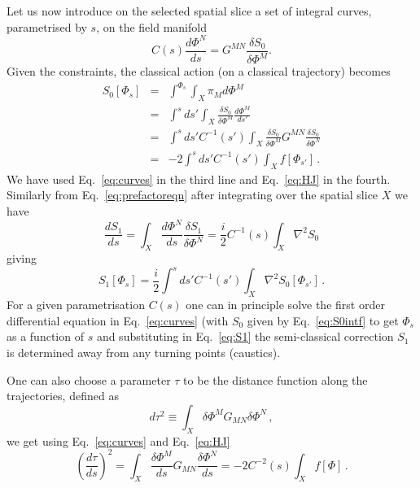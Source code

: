 \documentclass[a4paper,11pt]{article}
\numberwithin{equation}{section}
\begin{document}
Let us now introduce on the selected spatial slice a set of integral curves, parametrised
by $s$, on the field manifold
\begin{equation}
C(s)\frac{d\Phi^{N}}{ds}=G^{MN}\frac{\delta S_{0}}{\delta\Phi^{M}}.\label{eq:curves}
\end{equation}
Given the constraints, the classical action (on a classical trajectory) becomes
\begin{eqnarray}
S_{0}[\Phi_{s}] & = & \int^{\Phi_{s}}\int_{X}\pi_{M}d\Phi^{M}  \label{eq:HJ2}\nonumber \\
 & = & \int^{s}ds'\int_{X}\frac{\delta S_{0}}{\delta\Phi^{M}}\frac{d\Phi^{M}}{ds'}  \nonumber \\
 & = & \int^{s}ds'C^{-1}(s')\int_{X}\frac{\delta S_{0}}{\delta\Phi^{M}}G^{MN}\frac{\delta S_{0}}{\delta\Phi^{N}}  \nonumber \\
 & = & -2\int^{s}ds'C^{-1}(s')\int_{X}f[\Phi_{s'}] \,.\label{eq:S0intf}
\end{eqnarray}
We have used Eq.~\eqref{eq:curves} in the third line and Eq.~\eqref{eq:HJ} in the fourth. Similarly from Eq.~\eqref{eq:prefactoreqn} after integrating over the spatial
slice $X$ we have
\begin{equation}
\frac{dS_{1}}{ds}=\int_{X}\frac{d\Phi^{N}}{ds}\frac{\delta S_{1}}{\delta\Phi^{N}}=\frac{i}{2}C^{-1}(s)\int_{X}\nabla^{2}S_{0}\label{eq:dS1}
\end{equation}
giving
\begin{equation}
S_{1}[\Phi_{s}]=\frac{i}{2}\int^{s}ds'C^{-1}(s')\int_{X}\nabla^{2}S_{0}[\Phi_{s'}] \,. \label{eq:S1}
\end{equation}
For a given parametrisation $C(s)$ one can in principle  solve the first order differential equation in Eq.~\eqref{eq:curves} (with $S_0$ given by Eq.~\eqref{eq:S0intf} to get $\Phi_{s}$ as a function of $s$ and substituting in Eq.~\eqref{eq:S1} the semi-classical correction $S_{1}$ is determined away from any turning points (caustics). 

One can also choose a parameter $\tau$ to be the distance function along the trajectories, defined as
\begin{equation}
d\tau^{2}\equiv\int_{X}\delta\Phi^{M}G_{MN}\delta\Phi^{N} \,,\label{eq:dtau}
\end{equation}
we get using Eq.~\eqref{eq:curves} and Eq.~\eqref{eq:HJ}
\begin{equation}
\left(\frac{d\tau}{ds}\right)^{2}=\int_{X}\frac{\delta\Phi^{M}}{ds}G_{MN}\frac{\delta\Phi^{N}}{ds}=-2C^{-2}(s)\int_{X}f[\Phi] \,.\label{eq:dtauds}
\end{equation}
\end{document}
